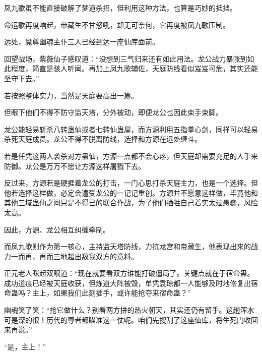 \begin{this_body}
凤九歌虽不能直接破解了梦道杀招，但利用这种方法，也算是巧妙的抵挡。

命运歌再度响起，帝藏生不甘怒吼，却无可奈何，它再度被凤九歌压制。

远处，魔尊幽魂主仆三人已经到达一座仙库面前。

回望战场，紫薇仙子感叹道：“没想到三气归来还有如此用法。龙公战力暴涨到如此程度，简直是骇人听闻。再加上凤九歌辅佐，天庭防线看似岌岌可危，其实还能坚守下去。”

若按照整体实力，当然是天庭要高出一筹。

但眼下他们不得不防守监天塔，分外被动，即便龙公也因此束手束脚。

龙公能轻易斩杀八转蛊仙或者七转仙蛊屋，而方源利用五指拳心剑，同样可以轻易杀死天庭成员。龙公不得不脱离防线，选择和方源在远处缠斗。

若是任凭这两人袭杀对方蛊仙，方源一点都不会心疼，但天庭却需要充足的人手来防御。龙公是万万不愿让方源这样屠戮下去。

反过来，方源若是硬捱着龙公的打击，一门心思打杀天庭主力，也是一个选择。但他若选择这样做，必定会遭受龙公的一记记重创。方源并不愿意这样做，毕竟他和其他三域蛊仙之间只是不得已的联合作战，为了他们牺牲自己着实太过愚蠢，风险太高。

因此，方源、龙公相互纠缠牵制。

而凤九歌则作为第一核心，主持监天塔防线，力抗龙宫和帝藏生，他表现出来的战力一而再，再而三地超出敌我双方的意料。

正元老人眯起双眼道：“现在就要看双方谁能打破僵局了。关键点就在于宿命蛊。成功道痕已经被天庭收获，但炼道大阵被毁，单凭袁琼都一人能够及时地修复出宿命蛊吗？主上，如果我们此刻插手，或许能抢夺来宿命蛊？”

幽魂笑了笑：“抢它做什么？别看两方拼的热火朝天，其实还仍有留手。这趟浑水可是深的很！历代的尊者都瞄准这一仗呢。咱们先搜刮了这座仙库，将生死门收回来再说。”

“是，主上！”

\end{this_body}

